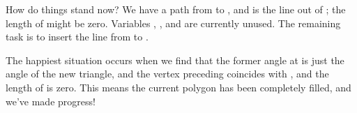 How do things stand now? We have a path from  to ,
and  is
the line out of ; the length of  might be zero. Variables %
, ,
and  are currently unused. The remaining task is to insert the line
from  to .

The happiest situation occurs when we find that the former angle at 
is
just the angle of the new triangle, and the vertex preceding 
coincides
with , and the length of  is zero. This means the current
polygon has been completely filled, and we've made progress!


